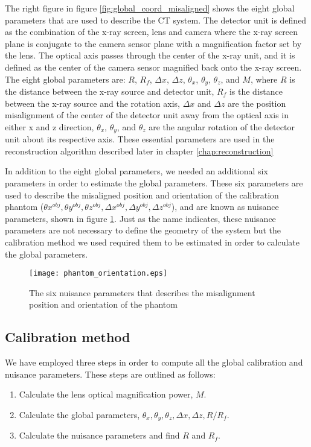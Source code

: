 The right figure in figure \ref{fig:global_coord_misaligned} shows the eight global parameters that are used to describe the CT system.  The detector unit is defined as the combination of the x-ray screen, lens and camera where the x-ray screen plane is conjugate to the camera sensor plane with a magnification factor set by the lens.  The optical axis passes through the center of the x-ray unit, and it is defined as the center of the camera sensor magnified back onto the x-ray screen.  The eight global parameters are: $R$, $R_f$, $\Delta x$, $\Delta z$, $\theta_x$, $\theta_y$, $\theta_z$, and $M$, where $R$ is the distance between the x-ray source and detector unit, $R_f$ is the distance between the x-ray source and the rotation axis, $\Delta x$ and $\Delta z$ are the position misalignment of the center of the detector unit away from the optical axis in either x and z direction, $\theta_x$, $\theta_y$, and $\theta_z$ are the angular rotation of the detector unit about its respective axis.  These essential parameters are used in the reconstruction algorithm described later in chapter \ref{chap:reconstruction}

In addition to the eight global parameters, we needed an additional six parameters in order to estimate the global parameters.  These six parameters are used to describe the misaligned position and orientation of the calibration phantom ($\theta x^{obj}, \theta y^{obj}, \theta z^{obj}, \Delta x^{obj}, \Delta y^{obj}, \Delta z^{obj}$), and are known as nuisance parameters, shown in figure \ref{fig:phantom_orientation}.  Just as the name indicates, these nuisance parameters are not necessary to define the geometry of the system but the calibration method we used required them to be estimated in order to calculate the global parameters.

\begin{figure}[ht]
\centering
\texttt{[image: phantom\_orientation.eps]}
\caption{The six nuisance parameters that describes the misalignment position and orientation of the phantom}
\label{fig:phantom_orientation}
\end{figure}

\subsection{Calibration method}
We have employed three steps in order to compute all the global calibration and nuisance parameters.  These steps are outlined as follows:

\begin{enumerate}
\item Calculate the lens optical magnification power, $M$.
\item Calculate the global parameters, $\theta_x, \theta_y, \theta_z, \Delta x, \Delta z, R/R_f$.
\item Calculate the nuisance parameters and find $R$ and $R_f$.
\end{enumerate}

